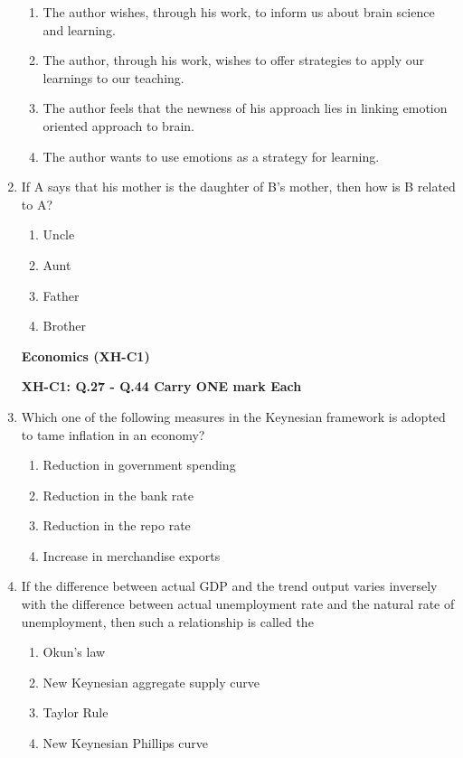 \documentclass[journal,12pt,onecolumn]{exam}
\theoremstyle{remark}
\begin{document}
\begin{enumerate}
  \begin{enumerate}[label=(\Alph*)]
    \item The author wishes, through his work, to inform us about brain science and learning.
    \item The author, through his work, wishes to offer strategies to apply our learnings to our teaching.
    \item The author feels that the newness of his approach lies in linking emotion oriented approach to brain.
    \item The author wants to use emotions as a strategy for learning.
  \end{enumerate}

  \item If A says that his mother is the daughter of B's mother, then how is B related to A?

  \begin{enumerate}[label=(\Alph*)]
    \item Uncle
    \item Aunt
    \item Father
    \item Brother
  \end{enumerate}

\newpage
\textbf{Economics (XH-C1) }

\textbf{XH-C1: Q.27 - Q.44 Carry ONE mark Each}

 \item Which one of the following measures in the Keynesian framework is adopted to tame inflation in an economy?

  \begin{enumerate}[label=(\Alph*)]
    \item Reduction in government spending
    \item Reduction in the bank rate
    \item Reduction in the repo rate
    \item Increase in merchandise exports
  \end{enumerate}

  \item If the difference between actual GDP and the trend output varies inversely with the difference between actual unemployment rate and the natural rate of unemployment, then such a relationship is called the

  \begin{enumerate}[label=(\Alph*)]
    \item Okun's law
    \item New Keynesian aggregate supply curve
    \item Taylor Rule
    \item New Keynesian Phillips curve
  \end{enumerate}


\end{enumerate}
\end{document}
